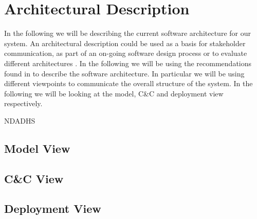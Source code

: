 \section{Architectural Description} %
\label{sec:Architectural Description}

In the following we will be describing the current software architecture for our system. An architectural description could be used as a basis for stakeholder communication, as part of an on-going software design process or to evaluate different architectures \cite{christensen}. In the following we will be using the recommendations found in \cite{christensen} to describe the software architecture. In particular we will be using different viewpoints to communicate the overall structure of the system. In the following we will be looking at the model, C\&C and deployment view respectively.

NDADHS

\subsection{Model View}

\subsection{C\&C View}

\subsection{Deployment View}


